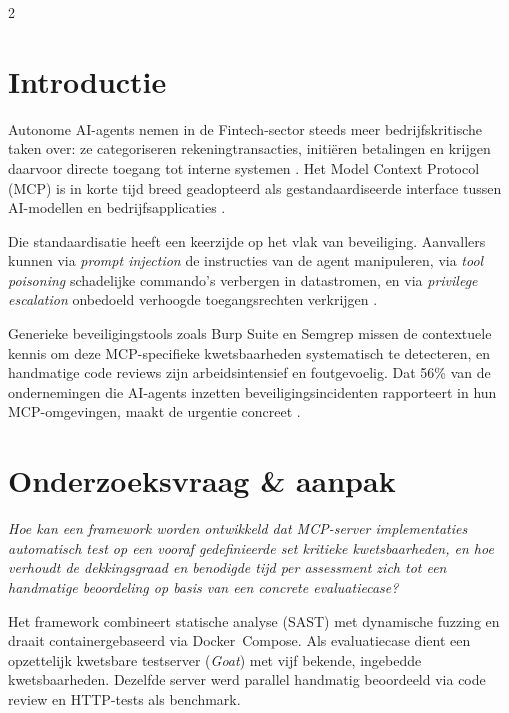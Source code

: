 \documentclass[a0,portrait]{hogent-poster}
\begin{document}
\begin{multicols}{2} %

\section{Introductie}

Autonome AI-agents nemen in de Fintech-sector steeds meer bedrijfskritische taken over: ze categoriseren rekeningtransacties, initiëren betalingen en krijgen daarvoor directe toegang tot interne systemen \autocite{russell2021artificialintelligence}. Het Model Context Protocol (MCP) is in korte tijd breed geadopteerd als gestandaardiseerde interface tussen AI-modellen en bedrijfsapplicaties \autocite{anthropic2024mcpwhitepaper}.

Die standaardisatie heeft een keerzijde op het vlak van beveiliging. Aanvallers kunnen via \emph{prompt injection} de instructies van de agent manipuleren, via \emph{tool poisoning} schadelijke commando's verbergen in datastromen, en via \emph{privilege escalation} onbedoeld verhoogde toegangsrechten verkrijgen \autocite{song2025protocolunveilingattackvectors}.

Generieke beveiligingstools zoals Burp Suite en Semgrep missen de contextuele kennis om deze MCP-specifieke kwetsbaarheden systematisch te detecteren, en handmatige code reviews zijn arbeidsintensief en foutgevoelig. Dat 56\% van de ondernemingen die AI-agents inzetten beveiligingsincidenten rapporteert in hun MCP-omgevingen, maakt de urgentie concreet \autocite{guo2025systematicanalysismcpsecurity}.

\section{Onderzoeksvraag \& aanpak}

\emph{Hoe kan een framework worden ontwikkeld dat MCP-server implementaties automatisch test op een vooraf gedefinieerde set kritieke kwetsbaarheden, en hoe verhoudt de dekkingsgraad en benodigde tijd per assessment zich tot een handmatige beoordeling op basis van een concrete evaluatiecase?}

Het framework combineert statische analyse (SAST) met dynamische fuzzing en draait containergebaseerd via Docker~Compose. Als evaluatiecase dient een opzettelijk kwetsbare testserver (\emph{Goat}) met vijf bekende, ingebedde kwetsbaarheden. Dezelfde server werd parallel handmatig beoordeeld via code review en HTTP-tests als benchmark.


\end{multicols}
\end{document}

